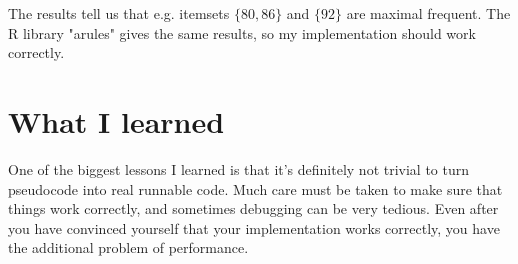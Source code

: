 \documentclass[a4paper,12pt]{article}
\begin{document}
The results tell us that e.g. itemsets $\{80, 86\}$ and $\{92\}$ are maximal
frequent. The R library "arules" gives the same results, so my implementation
should work correctly.

\section{What I learned}
One of the biggest lessons I learned is that it's definitely not trivial to
turn pseudocode into real runnable code. Much care must be taken to make sure
that things work correctly, and sometimes debugging can be very tedious. Even
after you have convinced yourself that your implementation works correctly,
you have the additional problem of performance.
\end{document}
